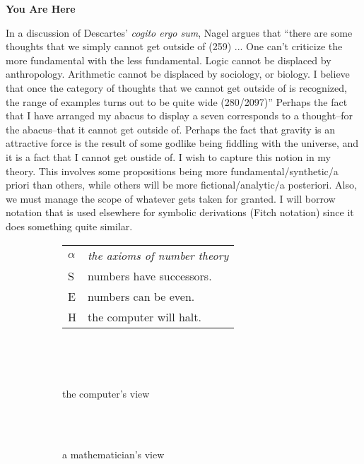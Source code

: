 \documentclass[12pt]{article}
\begin{document}
\begin{flushleft}
\setlength{\parindent}{0in}
\par\bigskip
\textbf{You Are Here}
\setlength{\parindent}{0.5in}

In a discussion of Descartes' \textit{cogito ergo sum}, Nagel argues that ``there are some thoughts that we simply cannot get outside of (259) ... One can't criticize the more fundamental with the less fundamental.  Logic cannot be displaced by anthropology.  Arithmetic cannot be displaced by sociology, or biology.  I believe that once the category of thoughts that we cannot get outside of is recognized, the range of examples turns out to be quite wide (280/2097)''
Perhaps the fact that I have arranged my abacus to display a seven corresponds to a thought--for the abacus--that it cannot get outside of.
Perhaps the fact that gravity is an attractive force is the result of some godlike being fiddling with the universe, and it is a fact that I cannot get oustide of.
I wish to capture this notion in my theory.
This involves some propositions being more fundamental/synthetic/a priori than others, while others will be more fictional/analytic/a posteriori.
Also, we must manage the scope of whatever gets taken for granted.
I will borrow notation that is used elsewhere for symbolic derivations (Fitch notation) since it does something quite similar.

\begin{figure}[h]
    \centering
    \begin{subfigure}{\linewidth}
        \centering
        \begin{tabular}{l|l}
            \hline
            $\alpha$ & \textit{the axioms of number theory}\\
            S & numbers have successors.\\
            E & numbers can be even.\\
            H & the computer will halt.\\
            \hline
        \end{tabular}
    \end{subfigure}\\
    \par\bigskip
    \begin{subfigure}{.5\linewidth}
        \hspace*{7em}%
        \fitchprf
        {
             \\
        }
        {
            \pline{\bigstar}
        }
        \caption{the computer's view}
        \label{computer}
    \end{subfigure}%
    \begin{subfigure}{.5\linewidth}
        \centering
        \fitchctx
        {
            \pline{\bigstar}\\
            \subproof
            {
                \pline{\mathnormal{\alpha}}
            }
            {
                 \\
            }
        }
        \caption{a mathematician's view}
        \label{mathematician}
    \end{subfigure}
    \caption{}
    \label{even}
\end{figure}


\end{flushleft}
\end{document}
